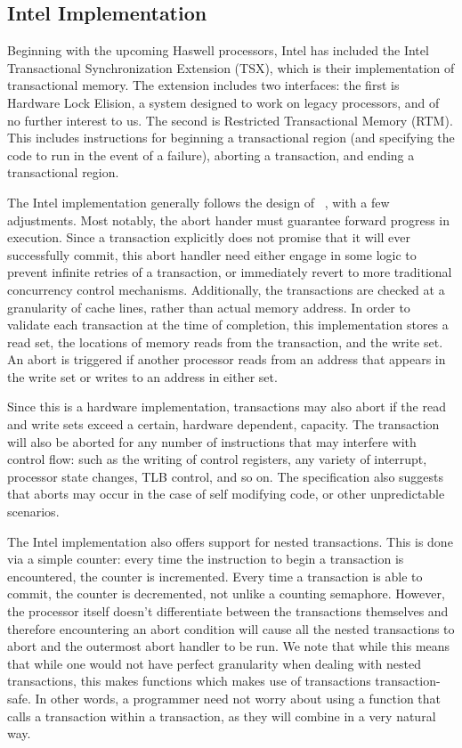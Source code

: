 \documentclass{acm_proc_article-sp}
\begin{document}
\subsection{Intel Implementation}

Beginning with the upcoming Haswell processors, Intel has included the Intel Transactional
Synchronization Extension (TSX), which is their implementation of transactional
memory. The extension includes two interfaces: the first is Hardware Lock
Elision, a system designed to work on legacy processors, and of no further
interest to us. The second is Restricted Transactional Memory (RTM). This 
includes instructions for beginning a transactional region (and specifying the
code to run in the event of a failure), aborting a transaction, and ending a 
transactional region. \cite{intelsys, intelblog}

The Intel implementation generally follows the design of 
~\cite{Herlihy:1993:TMA:173682.165164}, with a few adjustments.
Most notably, the abort hander must guarantee forward progress in 
execution. Since a transaction explicitly does not promise that it will 
ever successfully commit, this abort handler need either engage in some
logic to prevent infinite retries of a transaction, or immediately revert to more
traditional concurrency control mechanisms. 
Additionally, the transactions are checked at a granularity of cache lines, 
rather than actual memory address. In order to validate each transaction at the
time of completion, this implementation stores a read set, the locations of
memory reads from the transaction, and the write set. An abort is triggered
if another processor reads from an address that appears in the write set or 
writes to an address in either set.

Since this is a hardware implementation, transactions may also abort if the 
read and write sets exceed a certain, hardware dependent, capacity. The 
transaction will also be aborted for any number of instructions that may 
interfere with control flow: such as the writing of control registers, any 
variety of interrupt, processor state changes, TLB control, and so on. The 
specification also suggests that aborts may occur in the case of self modifying
code, or other unpredictable scenarios.

The Intel implementation also offers support for nested transactions. 
This is done via a simple counter: every time the instruction to begin a
transaction is encountered, the counter is incremented. Every time a 
transaction is able to commit, the counter is decremented, not unlike a
counting semaphore. However, the processor itself doesn't differentiate 
between the transactions themselves and therefore encountering an abort
condition will cause all the nested transactions to abort and the
outermost abort handler to be run. We note that while this means that
while one would not have perfect granularity when dealing with nested 
transactions, this makes functions which makes use of transactions
transaction-safe. In other words, a programmer need not worry about using 
a function that calls a transaction within a transaction, as they will
combine in a very natural way.
\end{document}
